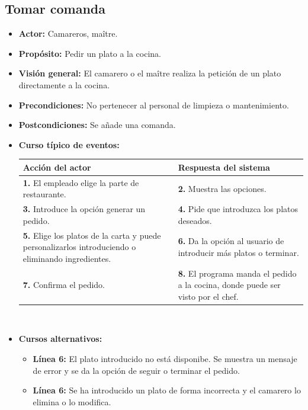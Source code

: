 \documentclass[spanish,a4paper,11pt, twoside]{report}	%
\begin{document}

		\subsection{Tomar comanda}
			\begin{itemize}
			\item \textbf{Actor:} Camareros, maître.
			\item \textbf{Propósito: } Pedir un plato a la cocina.
			\item \textbf{Visión general:} El camarero o el maître realiza la petición de un
				plato directamente a la cocina.
			\item \textbf{Precondiciones:} No pertenecer al personal de limpieza o
				mantenimiento.
			\item \textbf{Postcondiciones:} Se añade una comanda.
			\item \textbf{Curso típico de eventos:} 	\\
				\begin{tabular}{|p{6cm}||p{6cm}|}
				\hline
				\textbf{Acción del actor} & \textbf{Respuesta del sistema} \\ \hline \hline
				\textbf{1.} El empleado elige la parte de restaurante. & 
				\textbf{2.} Muestra las opciones.\\ \hline 
				\textbf{3.} Introduce la opción generar un pedido. & 
				\textbf{4.} Pide que introduzca los platos deseados. \\ \hline
				\textbf{5.} Elige los platos de la carta y puede personalizarlos introduciendo
						o eliminando ingredientes. & 
				\textbf{6.} Da la opción al usuario de introducir más platos o terminar. \\ \hline 
				\textbf{7.} Confirma el pedido.	& 
				\textbf{8.} El programa manda el pedido a la cocina, donde puede ser visto por el chef. \\ \hline 
			\end{tabular}
			\\
			\item \textbf{Cursos alternativos:} 
			\begin{itemize}
				\item  \textbf{Línea 6:} El plato introducido no está disponibe. Se muestra un mensaje
					de error y se da la opción de seguir o terminar el pedido.
				\item  \textbf{Línea 6:} Se ha introducido un plato de forma incorrecta y el
					camarero lo elimina o lo modifica.
			\end {itemize}
		\end {itemize}
		
\end{document}
